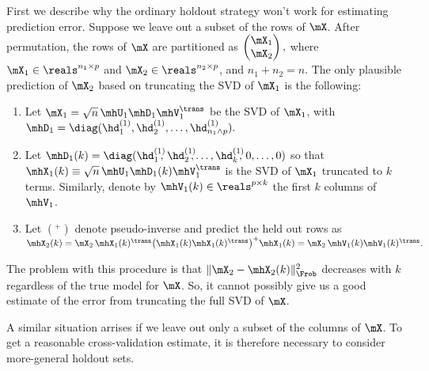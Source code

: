 First we describe why the ordinary holdout strategy won't work for estimating
prediction error.  Suppose we leave out a subset of the rows of $\mX$.  After
permutation, the rows of $\mX$ are partitioned as
\(
    \left(
    \begin{matrix}
        \mX_1 \\
        \mX_2
    \end{matrix}
    \right),
\)
where $\mX_1 \in \reals^{n_1 \times p}$ and $\mX_2 \in \reals^{n_2 \times p}$,
and $n_1 + n_2 = n$.  The only plausible prediction of $\mX_2$ based on truncating the SVD of $\mX_1$ is the following:
\begin{enumerate}
    \item Let $\mX_1 = \sqrt{n} \, \mhU_1 \mhD_1 \mhV_1^\trans$ be the SVD of
        $\mX_1$, with 
        \(
            \mhD_1 
                = 
                \diag( 
                    \hd_1^{(1)}, 
                    \hd_2^{(1)}, 
                    \ldots, 
                    \hd_{n_1 \wedge p}^{(1)}
                ).
        \)
    \item Let 
        \(
            \mhD_1(k)
                =
                \diag(
                    \hd_1^{(1)}\!\!\!, \,
                    \hd_2^{(1)}\!\!\!, 
                    \ldots, 
                    \hd_k^{(1)}\!\!\!, \,
                    0,
                    \ldots,
                    0
                )
        \)
        so that
        $\mhX_1(k) \equiv \sqrt{n} \, \mhU_1 \mhD_1(k) \mhV_1^\trans$ is
        the SVD of $\mX_1$ truncated to $k$ terms.  Similarly, denote
        by $\mhV_1(k) \in \reals^{p \times k}$ the first $k$ columns of
        $\mhV_1$.
    \item Let $(^+)$ denote pseudo-inverse and predict the held out rows as
        \(
            \mhX_2(k) 
                = 
                    \mX_2 \,
                    \mhX_1(k)^\trans
                    \big(
                        \mhX_1(k) \mhX_1(k)^\trans
                    \big)^{+}
                    \mhX_1(k)
                =
                    \mX_2 \, \mhV_1(k) \mhV_1(k)^\trans.
        \)
\end{enumerate}
The problem with this procedure is that $\| \mX_2 - \mhX_2(k) \|_\Frob^2$ 
decreases with $k$ regardless of the true model for $\mX$.  So, it cannot
possibly give us a good estimate of the error from truncating the full
SVD of $\mX$.

A similar situation arrises if we leave out only a subset of the columns of
$\mX$.  To get a reasonable cross-validation estimate, it is therefore 
necessary to consider more-general holdout sets.


